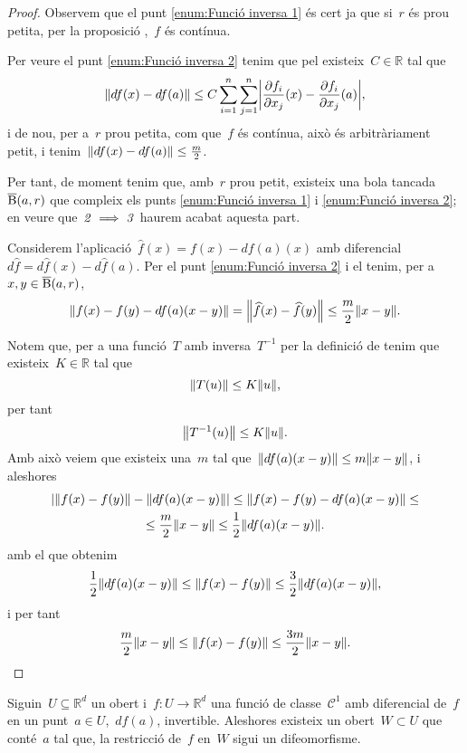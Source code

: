 \documentclass[../../main.tex]{subfiles}
\begin{document}
    \begin{proof}
        Observem que el punt \eqref{enum:Funció inversa 1} és cert ja que si~\(r\) és prou petita, per la proposició ,~\(f\) és contínua.

        Per veure el punt \eqref{enum:Funció inversa 2} tenim que pel  existeix~\(C\in\mathbb{R}\) tal que
        \[
            \norm{df(x)-df(a)}\leq C\sum_{i=1}^{n}\sum_{j=1}^{n}\abs{\frac{\partial f_{i}}{\partial x_{j}}(x)-\frac{\partial f_{i}}{\partial x_{j}}(a)},
        \]
        i de nou, per a~\(r\) prou petita, com que~\(f\) és contínua, això és arbitràriament petit, i tenim~\(\norm{df(x)-df(a)}\leq\frac{m}{2}\).

        Per tant, de moment tenim que, amb~\(r\) prou petit, existeix una bola tancada~\(\overline{\operatorname{B}}(a,r)\) que compleix els punts \eqref{enum:Funció inversa 1} i \eqref{enum:Funció inversa 2}; en veure que~\(\mathit{2}\implies\mathit{3}\) haurem acabat aquesta part.

        Considerem l'aplicació~\(\widehat{f}(x)=f(x)-df(a)(x)\) amb diferencial~\(d\widehat{f}=d\widehat{f}(x)-d\widehat{f}(a)\).
        Per el punt \eqref{enum:Funció inversa 2} i el  tenim, per a~\(x,y\in\overline{\operatorname{B}}(a,r)\), %
        \[
            \norm{f(x)-f(y)-df(a)(x-y)}=\norm{\widehat{f}(x)-\widehat{f}(y)}\leq\frac{m}{2}\norm{x-y}.
        \]

        Notem que, per a una funció~\(T\) amb inversa~\(T^{-1}\) per la definició de  tenim que existeix~\(K\in\mathbb{R}\) tal que
        \[
            \norm{T(u)}\leq K\norm{u},
        \]
        per tant
        \[
            \norm{T^{-1}(u)}\leq K\norm{u}.
        \]
        Amb això veiem que existeix una~\(m\) tal que~\(\norm{df(a)(x-y)}\leq m\norm{x-y}\), i aleshores
        \begin{multline*}
        \abs{\norm{f(x)-f(y)}-\norm{df(a)(x-y)}}\leq\norm{f(x)-f(y)-df(a)(x-y)}\leq\\\leq\frac{m}{2}\norm{x-y}\leq\frac{1}{2}\norm{df(a)(x-y)}.
        \end{multline*}
        amb el que obtenim
        \[
            \frac{1}{2}\norm{df(a)(x-y)}\leq\norm{f(x)-f(y)}\leq\frac{3}{2}\norm{df(a)(x-y)},
        \]
        i per tant
        \[
            \frac{m}{2}\norm{x-y}\leq\norm{f(x)-f(y)}\leq\frac{3m}{2}\norm{x-y}.\qedhere
        \]
    \end{proof}
    \begin{theorem}
        \label{thm:Funció inversa}
        Siguin~\(U\subseteq\mathbb{R}^{d}\) un obert i~\(f\colon U\to\mathbb{R}^{d}\) una funció de classe~\(\mathcal{C}^{1}\) amb diferencial de~\(f\) en un punt~\(a\in U\),~\(df(a)\), invertible.
        Aleshores existeix un obert~\(W\subset U\) que conté~\(a\) tal que, la restricció de~\(f\) en~\(W\) sigui un difeomorfisme.
    \end{theorem}
\end{document}
